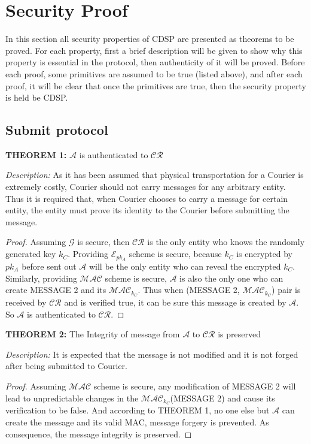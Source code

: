 \section{Security Proof}
In this section all security properties of CDSP are presented as theorems to be proved. For each property, first a brief description will be given to show why this property is essential in the protocol, then authenticity of it will be proved. Before each proof, some primitives are assumed to be true (listed above), and after each proof, it will be clear that once the primitives are true, then the security property is held be CDSP.

\subsection{Submit protocol}
\textbf{THEOREM 1:} $\mathcal{A}$ is authenticated to $\mathcal{CR}$

\bigskip
\noindent
\textit{Description: }As it has been assumed that physical transportation for a Courier is extremely costly, Courier should not carry messages for any arbitrary entity. Thus it is required that, when Courier chooses to carry a message for certain entity, the entity must prove its identity to the Courier before submitting the message.

\bigskip
\begin{proof}
Assuming $\mathcal{G}$ is secure, then $\mathcal{CR}$ is the only entity who knows the randomly generated key $k_C$. Providing $\mathcal{E}_{pk_A}$ scheme is secure, because $k_C$ is encrypted by $pk_A$ before sent out $\mathcal{A}$ will be the only entity who can reveal the encrypted $k_C$. Similarly, providing $\mathcal{MAC}$ scheme is secure, $\mathcal{A}$ is also the only one who can create MESSAGE 2 and its $\mathcal{MAC}_{k_C}$. Thus when (MESSAGE 2, $\mathcal{MAC}_{k_C}$) pair is received by $\mathcal{CR}$ and is verified true, it can be sure this message is created by $\mathcal{A}$. So $\mathcal{A}$ is authenticated to $\mathcal{CR}$.
\end{proof}

\vspace{1cm}
\noindent
\textbf{THEOREM 2:} The Integrity of message from $\mathcal{A}$ to $\mathcal{CR}$ is preserved

\bigskip
\noindent
\textit{Description: }It is expected that the message is not modified and it is not forged after being submitted to Courier.

\begin{proof}
Assuming $\mathcal{MAC}$ scheme is secure, any modification of MESSAGE 2 will lead to unpredictable changes in the $\mathcal{MAC}_{k_C}$(MESSAGE 2) and cause its verification to be false. And according to THEOREM 1, no one else but $\mathcal{A}$ can create the message and its valid MAC, message forgery is prevented. As consequence, the message integrity is preserved.
\end{proof}

